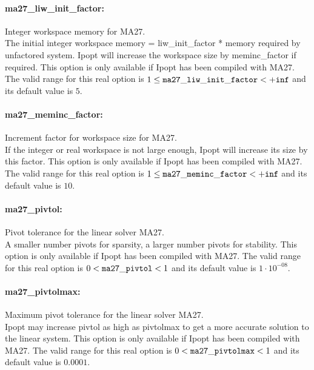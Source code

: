 \paragraph{ma27\_liw\_init\_factor:}\label{sec:ma27_liw_init_factor} Integer workspace memory for MA27. $\;$ \\
 The initial integer workspace memory =
liw\_init\_factor * memory required by unfactored
system. Ipopt will increase the workspace size by
meminc\_factor if required.  This option is only
available if Ipopt has been compiled with MA27. The valid range for this real option is 
$1 \le {\tt ma27\_liw\_init\_factor } <  {\tt +inf}$
and its default value is $5$.


\paragraph{ma27\_meminc\_factor:}\label{sec:ma27_meminc_factor} Increment factor for workspace size for MA27. $\;$ \\
 If the integer or real workspace is not large
enough, Ipopt will increase its size by this
factor.  This option is only available if Ipopt
has been compiled with MA27. The valid range for this real option is 
$1 \le {\tt ma27\_meminc\_factor } <  {\tt +inf}$
and its default value is $10$.


\paragraph{ma27\_pivtol:}\label{sec:ma27_pivtol} Pivot tolerance for the linear solver MA27. $\;$ \\
 A smaller number pivots for sparsity, a larger
number pivots for stability.  This option is only
available if Ipopt has been compiled with MA27. The valid range for this real option is 
$0 <  {\tt ma27\_pivtol } <  1$
and its default value is $1 \cdot 10^{-08}$.


\paragraph{ma27\_pivtolmax:}\label{sec:ma27_pivtolmax} Maximum pivot tolerance for the linear solver MA27. $\;$ \\
 Ipopt may increase pivtol as high as pivtolmax to
get a more accurate solution to the linear
system.  This option is only available if Ipopt
has been compiled with MA27. The valid range for this real option is 
$0 <  {\tt ma27\_pivtolmax } <  1$
and its default value is $0.0001$.


